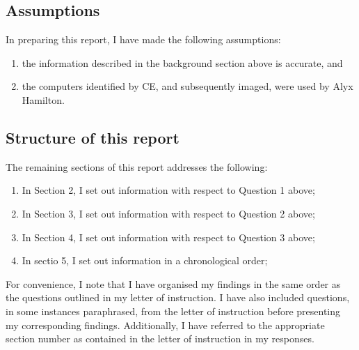 
\subsection{Assumptions} %
\begin{myenum}
     
     \item In preparing this report, I have made the following assumptions:
         \begin{enumerate}
            \item the information described in the background section above is accurate, and 
            \item the computers identified by CE, and subsequently imaged, were used by Alyx Hamilton.
         \end{enumerate}
\end{myenum}
\label{sub:assumptions}


\subsection{Structure of this report} %
\begin{myenum}
     \item The remaining sections of this report addresses the following:
         \begin{enumerate}
            \item In Section 2, I set out information with respect to Question 1 above;
            \item In Section 3, I set out information with respect to Question 2 above;
            \item In Section 4, I set out information with respect to Question 3 above;
            \item In sectio 5, I set out information in a chronological order;
         \end{enumerate}
     \item For convenience, I note that I have organised my findings in the same order as the questions outlined in my letter of instruction. I have also included questions, in some instances paraphrased, from the letter of instruction before presenting my corresponding findings. Additionally, I have referred to the appropriate section number as contained in the letter of instruction in my responses.
\end{myenum}
\label{sub:structure_of_this_report}



